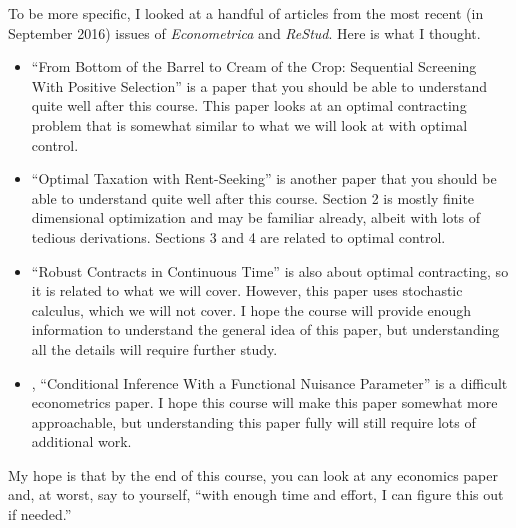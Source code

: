 \documentclass[10pt]{article}
\renewcommand{\cite}{\citet}
\begin{document}
To be more specific, I looked at a handful of articles from the most
recent (in September 2016) issues of {\slshape{Econometrica}} and
{\slshape{ReStud}}. Here is what I thought.
\begin{itemize}
\item \cite{tirole2016} ``From Bottom of the Barrel to Cream of the
  Crop: Sequential Screening With Positive Selection'' is a paper that
  you should be able to understand quite well after this course. This
  paper looks at an optimal contracting problem that is somewhat
  similar to what we will look at with optimal control. 
\item \cite{rs2016} ``Optimal Taxation with Rent-Seeking'' is another
  paper that you should be able to understand quite well after this
  course. Section 2 is mostly finite dimensional optimization and may
  be familiar already, albeit with lots of tedious
  derivations. Sections 3 and 4 are related to optimal control.
\item \cite{mr2016} ``Robust Contracts in Continuous Time'' is also
  about optimal contracting, so it is related to what we will
  cover. However, this paper uses stochastic calculus, which we will
  not cover. I hope the course will provide enough information to
  understand the general idea of this paper, but understanding all the
  details will require further study. 
\item \cite{am2016}, ``Conditional Inference With a Functional
  Nuisance Parameter'' is a difficult econometrics paper. I hope this
  course will make this paper somewhat more approachable, but
  understanding this paper fully will still require lots of additional
  work.
\end{itemize}
My hope is that by the end of this course, you can look at any
economics paper and, at worst, say to yourself, ``with enough time and
effort, I can figure this out if needed.'' 




\clearpage


\end{document}
